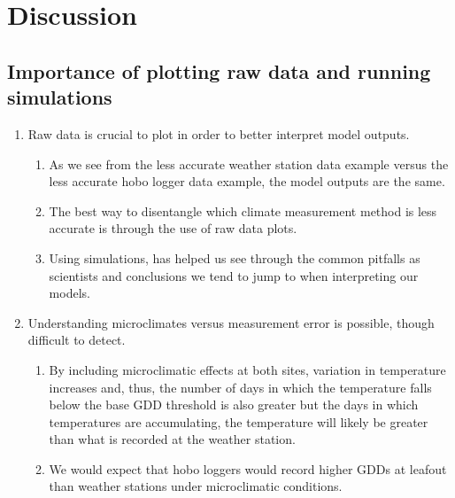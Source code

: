 \documentclass{article}\usepackage[]{graphicx}\usepackage[]{color}
\begin{document}
\section*{Discussion} 
\subsection*{Importance of plotting raw data and running simulations}
\begin{enumerate}
\item Raw data is crucial to plot in order to better interpret model outputs.
  \begin{enumerate}
  \item As we see from the less accurate weather station data example versus the less accurate hobo logger data example, the model outputs are the same.
  \item The best way to disentangle which climate measurement method is less accurate is through the use of raw data plots.
  \item Using simulations, has helped us see through the common pitfalls as scientists and conclusions we tend to jump to when interpreting our models. 
  \end{enumerate}
  
\item Understanding microclimates versus measurement error is possible, though difficult to detect. 
  \begin{enumerate}
  \item By including microclimatic effects at both sites, variation in temperature increases and, thus, the number of days in which the temperature falls below the base GDD threshold is also greater but the days in which temperatures are accumulating, the temperature will likely be greater than what is recorded at the weather station. 
  \item We would expect that hobo loggers would record higher GDDs at leafout than weather stations under microclimatic conditions.
  \end{enumerate}
\end{enumerate}
\end{document}
